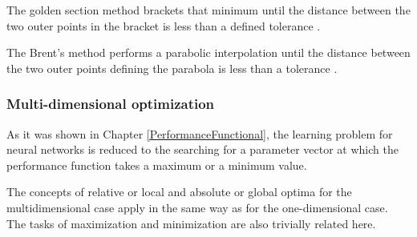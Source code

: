 The golden section method brackets that minimum until the distance
between the two outer points in the bracket is less than a defined
tolerance \cite{Press2002}.

The Brent's method performs a parabolic
interpolation until the distance between the two outer points
defining the parabola is less than a tolerance \cite{Press2002}.


\subsubsection{Multi-dimensional optimization}














As it was shown in Chapter \ref{PerformanceFunctional}, the learning problem for neural networks is reduced 
to the searching for a parameter vector at which the performance function takes
a maximum or a minimum value.

The concepts of relative or local and absolute or global optima for the multidimensional case apply in the same way as for the one-dimensional case. The tasks of maximization and minimization are also trivially related here. 

